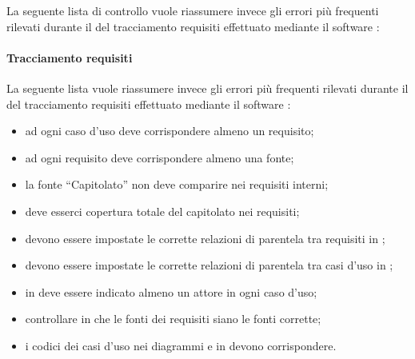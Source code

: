 \documentclass[12pt,a4paper]{article}
\begin{document}
La seguente lista di controllo vuole riassumere invece gli  errori più frequenti rilevati durante il  del tracciamento requisiti effettuato mediante il software :


\paragraph{Tracciamento requisiti}
La seguente lista vuole riassumere invece gli  errori più frequenti rilevati durante il  del tracciamento requisiti effettuato mediante il software :
\begin{itemize}
	\item ad ogni caso d’uso deve corrispondere almeno un requisito;
	\item ad ogni requisito deve corrispondere almeno una fonte; 
	\item la fonte “Capitolato” non deve comparire nei requisiti interni; 
	\item deve esserci copertura totale del capitolato nei requisiti;
	\item devono essere impostate le corrette relazioni di parentela tra requisiti in ; 
	\item devono essere impostate le corrette relazioni di parentela tra casi d’uso in ; 
	\item in  deve essere indicato almeno un attore in ogni caso d’uso;
	\item controllare in  che le fonti dei requisiti siano le fonti corrette; 
	\item i codici dei casi d’uso nei diagrammi e in  devono corrispondere.
\end{itemize}
\end{document}
